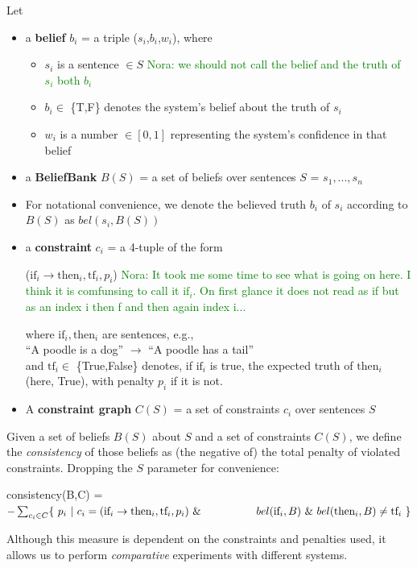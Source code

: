 \documentclass[11pt]{article}
\newcommand{\nk}[1]{\textcolor{green}{Nora: #1}}
\newenvironment{myquote}{                   %
  \parskip 0mm \begin{quoting}[vskip=0mm,leftmargin=2mm]}{
\end{quoting}}
\newenvironment{ite}{                     %
     \parskip 0cm \begin{itemize} \parskip 0cm \parsep 0cm \itemsep 0cm \topsep 0cm}{
        \end{itemize}} %
\begin{document}
\noindent Let
\vspace{-2mm}
\begin{ite}
 \item a {\bf belief} $b_i$ = a triple ($s_i$,$b_i$,$w_i$), where
    \begin{ite}
     \item $s_i$ is a sentence $\in S$ %
     \nk{we should not call the belief and the truth of $s_i$ both $b_i$}
     \item $b_i \in$ \{T,F\} denotes the system's belief about the truth of $s_i$
     \item $w_i$ is a number $\in [0,1]$ representing the system's confidence in that belief
    \end{ite}
 \item a {\bf BeliefBank} $B(S)$ = a set of beliefs over sentences $S$ = $s_1,...,s_n$
 \item For notational convenience, we denote the believed truth $b_i$ of $s_i$ according to $B(S)$ as $bel(s_i,B(S))$
 \item a {\bf constraint} $c_i$ = a 4-tuple of the form
\begin{myquote} \centering
($\textrm{if}_i \rightarrow \textrm{then}_i, \textrm{tf}_i, p_i$)
\nk{It took me some time to see what is going on here. I think it is comfunsing to call it $\textrm{if}_i$. On first glance it does not read as if but as an index i then f and then again index i...}
\end{myquote} 
where $\textrm{if}_i, \textrm{then}_i$ are sentences, e.g., \\
\vspace{1mm}
\hspace*{1mm} ``A poodle is a dog'' $\rightarrow$ ``A poodle has a tail'' \\
\vspace{1mm} 
and $\textrm{tf}_i \in$ \{True,False\} denotes, if $\textrm{if}_i$ is true, the expected truth of $\textrm{then}_i$ (here, True),
with penalty $p_i$ if it is not.
\item A {\bf constraint graph} $C(S)$ = a set of constraints $c_i$ over sentences $S$
\end{ite}
Given a set of beliefs $B(S)$ about $S$ and a set of constraints $C(S)$, we define the {\it consistency}
of those beliefs as (the negative of) the total penalty of violated constraints.
Dropping the $S$ parameter for convenience:
 \begin{myquote}
  consistency(B,C) = \\
\hspace*{2mm}  $- \sum_{c_i \in C} \{~ p_i ~ | ~ c_i = (\textrm{if}_i \rightarrow \textrm{then}_i, \textrm{tf}_i, p_i )       ~\& \\
\hspace*{18mm}  bel(\textrm{if}_i,B) ~ \& ~ bel(\textrm{then}_i,B) \neq \textrm{tf}_i~ \}$
\end{myquote}
Although this measure is dependent on the constraints and penalties used,
it allows us to perform {\it comparative} experiments with different systems.
\end{document}
